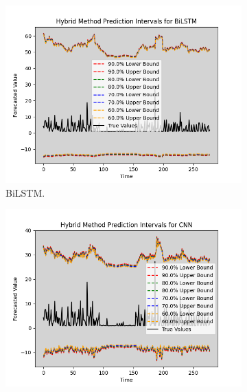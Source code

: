 \begin{figure}[H]
\begin{minipage}{0.45\textwidth}
        \label{F 4.3}
    \end{minipage}
    \hfill
    \begin{minipage}{0.45\textwidth}
        \centering
        \begin{subfigure}[b]{\textwidth}
            \centering
            \includegraphics[width=\textwidth]{Chap03/figs/BiLSTM_hybrid_method_plot_Electricity_Consumption_Method2.png}
            \caption{BiLSTM.}
        \end{subfigure}
        \hfill
        \begin{subfigure}[b]{\textwidth}
            \centering
            \includegraphics[width=\textwidth]{Chap03/figs/CNN_hybrid_method_plot_Electricity_Consumption_Method2.png}

\end{subfigure}
\end{minipage}
\end{figure}
